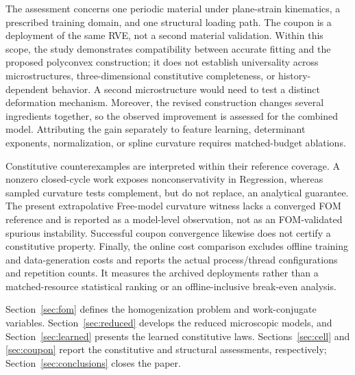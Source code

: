 The assessment concerns one periodic material under plane-strain kinematics, a prescribed training domain, and one structural loading path. The coupon is a deployment of the same RVE, not a second material validation. Within this scope, the study demonstrates compatibility between accurate fitting and the proposed polyconvex construction; it does not establish universality across microstructures, three-dimensional constitutive completeness, or history-dependent behavior. A second microstructure would need to test a distinct deformation mechanism. Moreover, the revised construction changes several ingredients together, so the observed improvement is assessed for the combined model. Attributing the gain separately to feature learning, determinant exponents, normalization, or spline curvature requires matched-budget ablations.

Constitutive counterexamples are interpreted within their reference coverage. A nonzero closed-cycle work exposes nonconservativity in Regression, whereas sampled curvature tests complement, but do not replace, an analytical guarantee. The present extrapolative Free-model curvature witness lacks a converged FOM reference and is reported as a model-level observation, not as an FOM-validated spurious instability. Successful coupon convergence likewise does not certify a constitutive property. Finally, the online cost comparison excludes offline training and data-generation costs and reports the actual process/thread configurations and repetition counts. It measures the archived deployments rather than a matched-resource statistical ranking or an offline-inclusive break-even analysis.

Section~\ref{sec:fom} defines the homogenization problem and work-conjugate variables. Section~\ref{sec:reduced} develops the reduced microscopic models, and Section~\ref{sec:learned} presents the learned constitutive laws. Sections~\ref{sec:cell} and \ref{sec:coupon} report the constitutive and structural assessments, respectively; Section~\ref{sec:conclusions} closes the paper.

\FloatBarrier
